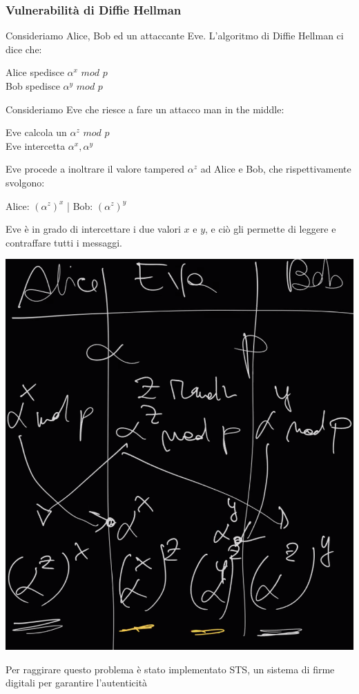 \documentclass[11pt, oneside]{article}   	%
\begin{document}
\subsubsection*{Vulnerabilità di Diffie Hellman}
Consideriamo Alice, Bob ed un attaccante Eve. L'algoritmo di Diffie Hellman ci dice che:
\begin{center}
Alice spedisce $\alpha^x$ $mod$ $p$\\
Bob spedisce $\alpha^y$ $mod$ $p$\\
 \end{center}
 Consideriamo Eve che riesce a fare un attacco man in the middle:
 \begin{center}
 Eve calcola un $\alpha^z$ $mod$ $p$\\
 Eve intercetta $\alpha^x, \alpha^y$
 \end{center}
 Eve procede a inoltrare il valore tampered $\alpha^z$ ad Alice e Bob, che rispettivamente svolgono:
 \begin{center}
 Alice: $(\alpha^z)^x$ | Bob: $(\alpha^z)^y$
 \end{center}
 Eve è in grado di intercettare i due valori $x$ e $y$, e ciò gli permette di leggere e contraffare tutti i messaggi.
\begin{center}
\includegraphics[scale= 0.5]{ld1}
\end{center}
Per raggirare questo problema è stato implementato STS, un sistema di firme digitali per garantire l'autenticità
\end{document}

